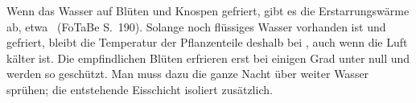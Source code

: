 Wenn das Wasser auf Blüten und Knospen gefriert, gibt es die Erstarrungswärme ab, etwa \LfEO\ (FoTaBe S.~190). Solange noch flüssiges Wasser vorhanden ist und gefriert, bleibt die Temperatur der Pflanzenteile deshalb bei \TnO, auch wenn die Luft kälter ist. Die empfindlichen Blüten erfrieren erst bei einigen Grad unter null und werden so geschützt. Man muss dazu die ganze Nacht über weiter Wasser sprühen; die entstehende Eisschicht isoliert zusätzlich.
